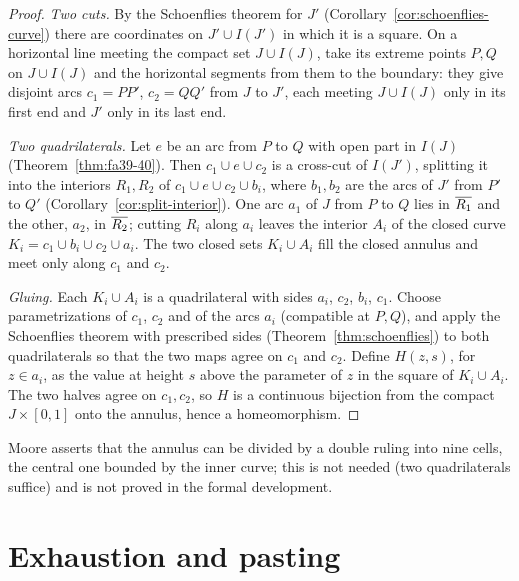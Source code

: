 \begin{proof}
\emph{Two cuts.} By the Schoenflies theorem for $J'$ (Corollary~\ref{cor:schoenflies-curve}) there are coordinates on $J'\cup I(J')$ in
which it is a square. On a horizontal line meeting the compact set $J\cup I(J)$, take its extreme points $P,Q$ on $J\cup I(J)$ and the
horizontal segments from them to the boundary: they give disjoint arcs $c_1=PP'$, $c_2=QQ'$ from $J$ to $J'$, each meeting $J\cup I(J)$
only in its first end and $J'$ only in its last end.

\emph{Two quadrilaterals.} Let $e$ be an arc from $P$ to $Q$ with open part in $I(J)$ (Theorem~\ref{thm:fa39-40}). Then $c_1\cup e\cup c_2$
is a cross-cut of $I(J')$, splitting it into the interiors $R_1,R_2$ of $c_1\cup e\cup c_2\cup b_i$, where $b_1,b_2$ are the arcs of $J'$
from $P'$ to $Q'$ (Corollary~\ref{cor:split-interior}). One arc $a_1$ of $J$ from $P$ to $Q$ lies in $\overline{R_1}$ and the other, $a_2$, in
$\overline{R_2}$; cutting $R_i$ along $a_i$ leaves the interior $A_i$ of the closed curve $K_i=c_1\cup b_i\cup c_2\cup a_i$. The two closed sets
$K_i\cup A_i$ fill the closed annulus and meet only along $c_1$ and $c_2$.

\emph{Gluing.} Each $K_i\cup A_i$ is a quadrilateral with sides $a_i$, $c_2$, $b_i$, $c_1$. Choose parametrizations of $c_1$, $c_2$ and of
the arcs $a_i$ (compatible at $P,Q$), and apply the Schoenflies theorem with prescribed sides (Theorem~\ref{thm:schoenflies}) to both
quadrilaterals so that the two maps agree on $c_1$ and $c_2$. Define $H(z,s)$, for $z\in a_i$, as the value at height $s$ above the
parameter of $z$ in the square of $K_i\cup A_i$. The two halves agree on $c_1,c_2$, so $H$ is a continuous bijection from the compact
$J\times[0,1]$ onto the annulus, hence a homeomorphism.
\end{proof}


Moore asserts that the annulus can be divided by a double ruling into nine cells, the central one bounded by the inner curve; this is not
needed (two quadrilaterals suffice) and is not proved in the formal development.

\section{Exhaustion and pasting}\label{sec:paste}

